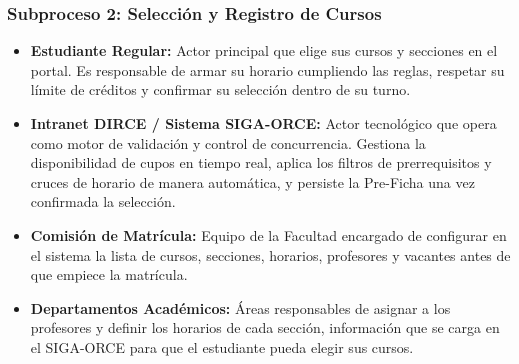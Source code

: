 \subsubsection{Subproceso 2: Selección y Registro de Cursos}

\begin{itemize}
    \item \textbf{Estudiante Regular:} Actor principal que elige sus cursos y secciones en el portal. Es responsable de armar su horario cumpliendo las reglas, respetar su límite de créditos y confirmar su selección dentro de su turno.

    \item \textbf{Intranet DIRCE / Sistema SIGA-ORCE:} Actor tecnológico que opera como motor de validación y control de concurrencia. Gestiona la disponibilidad de cupos en tiempo real, aplica los filtros de prerrequisitos y cruces de horario de manera automática, y persiste la Pre-Ficha una vez confirmada la selección.

    \item \textbf{Comisión de Matrícula:} Equipo de la Facultad encargado de configurar en el sistema la lista de cursos, secciones, horarios, profesores y vacantes antes de que empiece la matrícula.

    \item \textbf{Departamentos Académicos:} Áreas responsables de asignar a los profesores y definir los horarios de cada sección, información que se carga en el SIGA-ORCE para que el estudiante pueda elegir sus cursos.
\end{itemize}
